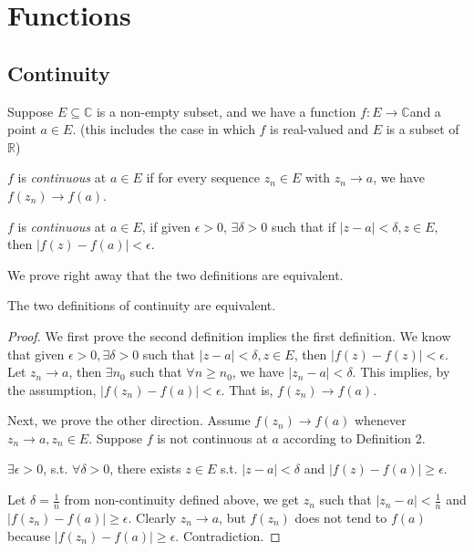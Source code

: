 \section{Functions}
\subsection{Continuity}
Suppose \(E \subseteq \mathbb{C}\) is a non-empty subset, and we have a function \(f: E \to \mathbb{C}\)and a point \(a \in E\). (this includes the case in which \(f\) is real-valued and \(E\) is a subset of \(\mathbb{R}\))
\begin{definition}
    \(f\) is \textit{continuous}  at \(a \in E\) if for every sequence \(z_n \in E\) with \(z_n \to a\), we have \(f(z_n) \to f(a)\).
\end{definition}
\begin{definition}
    \(f\) is \textit{continuous} at \(a \in E\), if given \(\epsilon > 0\), \(\exists \delta>0\) such that if \(\left\vert z-a \right\vert <\delta, z \in E\), then \(\left\vert f(z) - f(a)\right\vert < \epsilon\).
\end{definition}
We prove right away that the two definitions are equivalent.
\begin{theorem}
    The two definitions of continuity are equivalent.
\end{theorem}
\begin{proof}
    We first prove the second definition implies the first definition. We know that given \(\epsilon>0, \exists \delta>0\) such that \(\left\vert z - a \right\vert < \delta, z \in E\), then \(\left\vert f(z) - f(z) \right\vert < \epsilon\). Let \(z_n \to a\), then \(\exists n_0\) such that \(\forall n \geq n_0\), we have \(\left\vert z_n - a \right\vert < \delta\). This implies, by the assumption, \(\left\vert f(z_n) - f(a) \right\vert < \epsilon\). That is, \(f(z_n) \to f(a)\).

    Next, we prove the other direction. Assume \(f(z_n)\to f(a)\) whenever \(z_n \to a, z_n \in E\). Suppose \(f\) is not continuous at \(a\) according to Definition 2.

    \(\exists \epsilon>0\), s.t. \(\forall \delta>0\), there exists \(z\in E\) s.t. \(\left\vert z-a \right\vert < \delta\) and \(\left\vert f(z) -f(a) \right\vert \geq \epsilon\).

    Let \(\delta=\frac{1}{n}\) from non-continuity defined above, we get \(z_n\) such that \(\left\vert z_n - a \right\vert <\frac{1}{n}\) and \(\left\vert f(z_n) - f(a) \right\vert \geq \epsilon\). Clearly \(z_n \to a\), but \(f(z_n)\) does not tend to \(f(a)\) because \(\left\vert f(z_n) - f(a) \right\vert \geq \epsilon\). Contradiction.
\end{proof}
